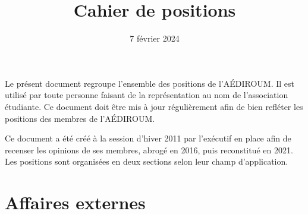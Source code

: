 \documentclass{aediroum}
\title{Cahier de positions}
\date{7 février 2024}
\begin{document}
\maketitle

Le présent document regroupe l'ensemble des positions de l'AÉDIROUM. Il est utilisé par toute personne faisant de la représentation au nom de l'association étudiante. Ce document doit être mis à jour régulièrement afin de bien refléter les positions des membres de l'AÉDIROUM.

Ce document a été créé à la session d'hiver 2011 par l'exécutif en place afin de recenser les opinions de ses membres, abrogé en 2016, puis reconstitué en 2021. Les positions sont organisées en deux sections selon leur champ d'application.

\section{Affaires externes}\label{sec:affaires-externes}
\end{document}
